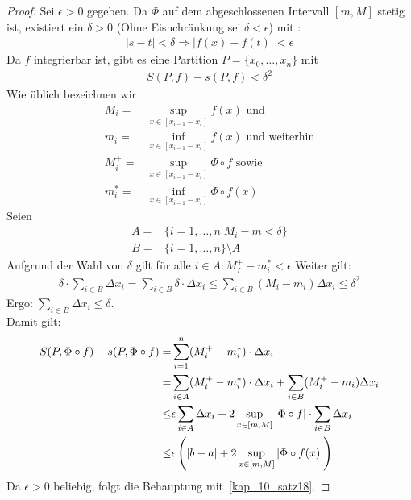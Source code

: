 \begin{proof}	
	 Sei $\epsilon > 0$ gegeben. Da $\Phi$ auf dem abgeschlossenen Intervall 
	$[m,M]$ stetig ist, existiert ein $\delta > 0$ 
	(Ohne Eisnchränkung sei $\delta < \epsilon$) mit :
	\begin{align*}
		\vert s - t\vert < \delta \Rightarrow \vert f(x) - f(t) \vert < \epsilon
	\end{align*}
	Da $f$ integrierbar ist, gibt es eine Partition $P = \{x_0, \hdots, x_n\}$
	mit 
	\begin{align*}
		S(P,f) - s(P,f) < \delta^2
	\end{align*}		
	Wie üblich bezeichnen wir 
	\begin{align*}
		M_i = & \sup_{x \in [x_{i-1}-x_i]} f(x) \text{ und } \\
		m_i = & \inf_{x \in [x_{i-1}-x_i]} f(x) \text{ und weiterhin} \\
		M_i^+ = & \sup_{x \in [x_{i-1}-x_i]} \Phi \circ f \text{ sowie } \\
		m_i^* = & \inf_{x \in [x_{i-1}-x_i]} \Phi \circ f(x)
	\end{align*}		
	Seien
	\begin{align*}
		A = & \{i = 1, \hdots, n \vert M_i -m < \delta \} \\
		B = & \{ i = 1, \hdots, n\} \setminus A
	\end{align*}
	Aufgrund der Wahl von $\delta$ gilt für alle $ i \in A: M_I^+ - m_i^* < \epsilon$
	Weiter gilt: 
	\begin{align*}
		\delta \cdot \sum_{i \in B} \Delta x_i = \sum_{i \in B} \delta \cdot \Delta x_i 
		\leq  \sum_{i \in B} (M_i - m_i) \Delta x_i \leq \delta^2
	\end{align*}
	Ergo: $\sum_{i \in B} \Delta x_i \leq \delta$. \\
	Damit gilt:
	\begin{align*}
		S(P, \Phi \circ f) - s(P, \Phi \circ f) = 
		& \sum_{i = 1}^n (M_i^+ - m_i^*) \cdot\Delta x_i  \\
		= & \sum_{i \in A} (M_i^+ - m_i^* ) \cdot \Delta x_i + 
			\sum_{i \in B} (M_i^+ -m_i) \Delta x_i \\
		\leq & \epsilon \sum_{i \in A}\Delta x_i + 2 \sup_{x \in [m,M]} \abs{
			\Phi \circ f} \cdot \sum_{i \in B} \Delta x_i \\
		\leq & \epsilon \left(|b-a| + 2\sup_{x \in [m,M]} \abs{\Phi \circ f(x)}\right)
	\end{align*}
	Da $\epsilon > 0$ beliebig, folgt die Behauptung mit~\ref{kap_10_satz18}.
\end{proof}

